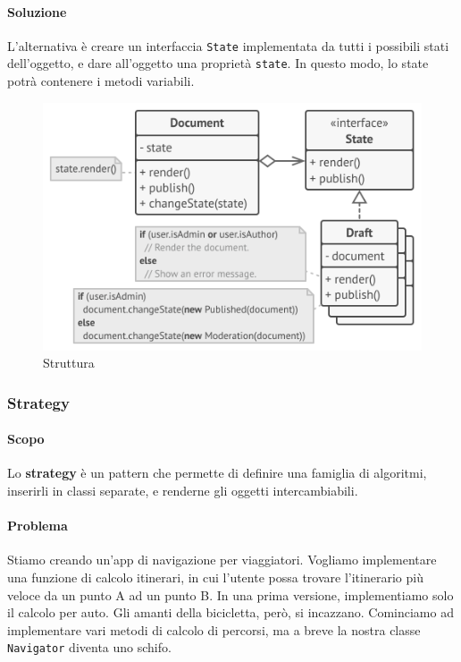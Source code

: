 \documentclass[11pt]{article}
\newcommand{\code}[1]{\texttt{#1}}
\begin{document}
\paragraph{Soluzione}
L'alternativa è creare un interfaccia \code{State} implementata da tutti i possibili stati dell'oggetto, e dare all'oggetto una proprietà \code{state}. In questo modo, lo state potrà contenere i metodi variabili.  
\begin{figure}[H]
    \includegraphics[width=\linewidth]{res/teoria/State.png}
    \caption{Struttura}
\end{figure}
\subsubsection{Strategy}
\paragraph{Scopo}
Lo \textbf{strategy} è un pattern che permette di definire una famiglia di algoritmi, inserirli in classi separate, e renderne gli oggetti intercambiabili. 
\paragraph{Problema}
Stiamo creando un'app di navigazione per viaggiatori. Vogliamo implementare una funzione di calcolo itinerari, in cui l'utente possa trovare l'itinerario più veloce da un punto A ad un punto B. In una prima versione, implementiamo solo il calcolo per auto. Gli amanti della bicicletta, però, si incazzano. Cominciamo ad implementare vari metodi di calcolo di percorsi, ma a breve la nostra classe \code{Navigator} diventa uno schifo. 
\end{document}
